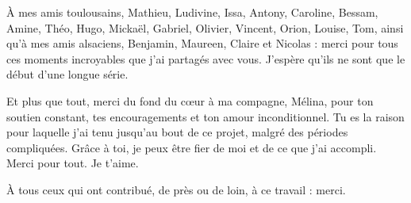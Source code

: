 \begin{remerciements}
À mes amis toulousains, Mathieu, Ludivine, Issa, Antony, Caroline, Bessam, Amine, Théo, Hugo, Mickaël, Gabriel, Olivier, Vincent, Orion, Louise, Tom, ainsi qu'à mes amis alsaciens, Benjamin, Maureen, Claire et Nicolas : merci pour tous ces moments incroyables que j'ai partagés avec vous. J'espère qu'ils ne sont que le début d'une longue série.

Et plus que tout, merci du fond du cœur à ma compagne, Mélina, pour ton soutien constant, tes encouragements et ton amour inconditionnel. Tu es la raison pour laquelle j'ai tenu jusqu'au bout de ce projet, malgré des périodes compliquées. Grâce à toi, je peux être fier de moi et de ce que j'ai accompli. Merci pour tout. Je t'aime.

À tous ceux qui ont contribué, de près ou de loin, à ce travail : merci.

\end{remerciements}
